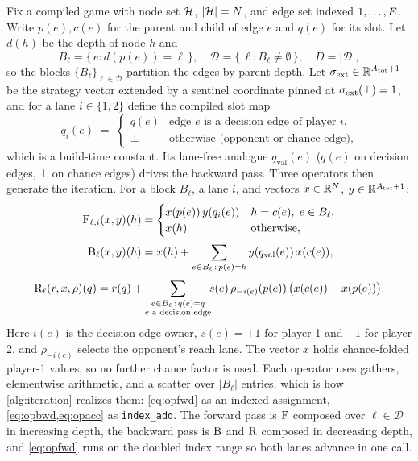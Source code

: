 Fix a compiled game with node set $\mathcal{H}$, $|\mathcal{H}| = N$, and edge set
indexed $1, \dots, E$. Write $p(e), c(e)$ for the parent and child of edge
$e$ and $q(e)$ for its slot. Let $d(h)$ be the depth of node $h$ and
\begin{equation}
    B_\ell = \{\, e : d(p(e)) = \ell \,\},
    \quad
    \mathcal{D} = \{\, \ell : B_\ell \neq \emptyset \,\},
    \quad
    D = |\mathcal{D}|,
    \label{eq:blocks}
\end{equation}
so the blocks $\{B_\ell\}_{\ell \in \mathcal{D}}$ partition the edges by parent depth.
Let $\sigma_{\mathrm{ext}} \in \mathbb{R}^{A_{\mathrm{tot}} + 1}$ be the strategy vector extended by a
sentinel coordinate pinned at $\sigma_{\mathrm{ext}}(\bot) = 1$, and for a lane
$i \in \{1,2\}$ define the compiled slot map
\begin{equation}
    q_i(e) \;=\;
    \begin{cases}
        q(e) & \text{edge } e \text{ is a decision edge of player } i,\\
        \bot & \text{otherwise (opponent or chance edge)},
    \end{cases}
    \label{eq:slotmap}
\end{equation}
which is a build-time constant. Its lane-free analogue $q_{\mathrm{val}}(e)$
($q(e)$ on decision edges, $\bot$ on chance edges) drives the backward pass.
Three operators then generate the iteration. For a
block $B_\ell$, a lane $i$, and vectors $x \in \mathbb{R}^{N}$, $y \in \mathbb{R}^{A_{\mathrm{tot}}+1}$:
\begin{align}
    \mathrm{F}_{\ell,i}(x, y)(h)
        &=
        \begin{cases}
            x(p(e))\, y(q_i(e)) & h = c(e),\; e \in B_\ell,\\
            x(h) & \text{otherwise},
        \end{cases}
        \label{eq:opfwd} \\[2pt]
    \mathrm{B}_{\ell}(x, y)(h)
        &= x(h) + \sum_{e \in B_\ell \,:\, p(e) = h} y(q_{\mathrm{val}}(e))\, x(c(e)),
        \label{eq:opbwd}
\end{align}
\begin{equation}
    \mathrm{R}_{\ell}(r, x, \rho)(q)
        = r(q)
        + \sum_{\substack{e \in B_\ell \,:\, q(e) = q \\ e \text{ a decision edge}}}\!\!
        s(e)\,\rho_{-i(e)}(p(e))\,\big(x(c(e)) - x(p(e))\big).
        \label{eq:opacc}
\end{equation}
Here $i(e)$ is the decision-edge owner, $s(e)=+1$ for player 1 and $-1$
for player 2, and $\rho_{-i(e)}$ selects the opponent's reach lane. The vector
$x$ holds chance-folded player-1 values, so no further chance factor is used.
Each operator uses gathers, elementwise arithmetic, and a scatter over $|B_\ell|$
entries, which is how \cref{alg:iteration} realizes them: \cref{eq:opfwd} as an
indexed assignment, \cref{eq:opbwd,eq:opacc} as \texttt{index\_add}. The forward pass is
$\mathrm{F}$ composed over $\ell \in \mathcal{D}$ in increasing depth, the backward pass is
$\mathrm{B}$ and $\mathrm{R}$ composed in decreasing depth, and \cref{eq:opfwd} runs on the doubled
index range so both lanes advance in one call.

